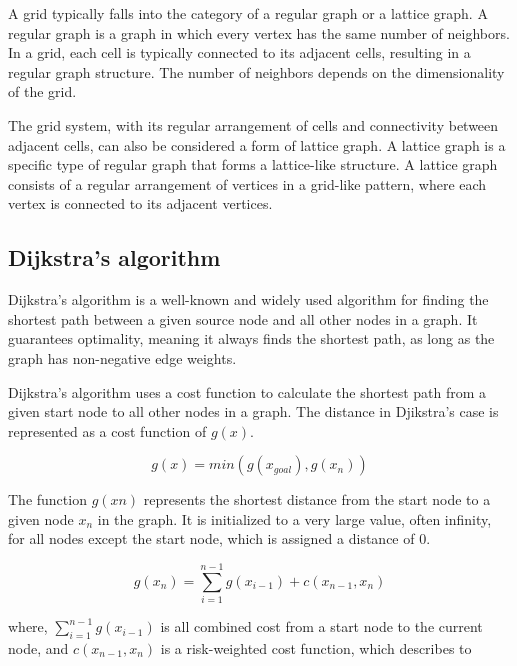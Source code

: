 \documentclass[12pt]{report}
\begin{document}
        A grid typically falls into the category of a regular graph or a lattice graph. A regular graph is a graph in
        which every vertex has the same number of neighbors. In a grid, each cell is typically connected to its adjacent
        cells, resulting in a regular graph structure. The number of neighbors depends on the dimensionality of the
        grid.
            
        The grid system, with its regular arrangement of cells and connectivity between adjacent cells, can also be
        considered a form of lattice graph. A lattice graph is a specific type of regular graph that forms a
        lattice-like structure. A lattice graph consists of a regular arrangement of vertices in a grid-like pattern,
        where each vertex is connected to its adjacent vertices.

        \subsection{Dijkstra's algorithm}
        Dijkstra's algorithm is a well-known and widely used algorithm for finding the shortest path between a given
        source node and all other nodes in a graph. It guarantees optimality, meaning it always finds the shortest path,
        as long as the graph has non-negative edge weights.

        Dijkstra's algorithm uses a cost function to calculate the shortest path from a given start node to all other
        nodes in a graph. The distance in Djikstra's case is represented as a cost function of \(g(x)\).

        \begin{equation}
            g(x)=min(g(x_{goal}),g(x_n))
        \end{equation}

        The function \(g(xn)\) represents the shortest distance from the start node to a given node \(x_n\) in the
        graph. It is initialized to a very large value, often infinity, for all nodes except the start node, which is
        assigned a distance of 0.
        
        \begin{equation}\label{eq:costfunction}
            g(x_n)=\sum_{i=1}^{n-1}g(x_{i-1})+c(x_{n-1},x_n)
        \end{equation}

        where, $\sum_{i=1}^{n-1} g(x_{i-1})$ is all combined cost from a start node to the current node, and $c(x_{n-1},
        x_n)$ is a risk-weighted cost function, which describes to
\end{document}
